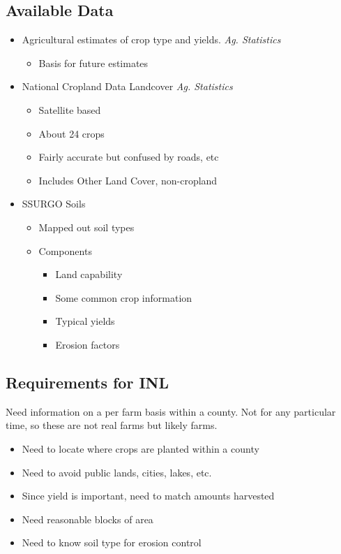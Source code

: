 \documentclass{elsart}
\begin{document}
\subsection{Available Data}
  \begin{itemize}
  \item Agricultural estimates of crop type and yields. \emph{Ag. Statistics}
    \begin{itemize}
    \item Basis for future estimates
    \end{itemize}
  \item National Cropland Data Landcover \emph{Ag. Statistics}
    \begin{itemize}
    \item Satellite based
    \item About 24 crops
    \item Fairly accurate but confused by roads, etc
    \item Includes Other Land Cover, non-cropland
    \end{itemize}
  \item SSURGO Soils %
    \begin{itemize}
    \item Mapped out soil types
    \item Components
      \begin{itemize}
      \item Land capability
      \item Some common crop information
      \item Typical yields
      \item Erosion factors
      \end{itemize}
    \end{itemize}
  \end{itemize}

\subsection{Requirements for INL}

  Need information on a per farm basis within a county.  Not for any
  particular time, so these are not real farms but likely farms.

  \begin{itemize}
  \item Need to locate where crops are planted within a county
  \item Need to avoid public lands, cities, lakes, etc.
  \item Since yield is important, need to match amounts harvested
  \item Need reasonable blocks of area
  \item Need to know soil type for erosion control
  \end{itemize}
\end{document}
